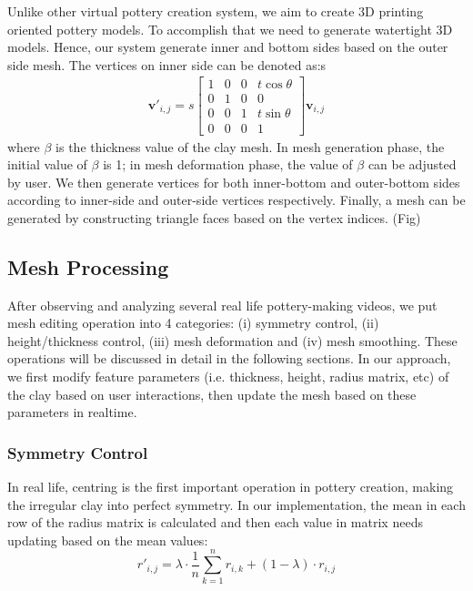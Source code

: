 Unlike other virtual pottery creation system, we aim to create 3D printing oriented pottery models. To accomplish that we need to generate watertight 3D models. Hence, our system generate inner and bottom sides based on the outer side mesh. The vertices on inner side can be denoted as:s
\begin{equation}
\begin{split}
\mathbf{v'}_{i,j} = s
\begin{bmatrix}
1 & 0 & 0 & t\cos\theta \\
0 & 1 & 0 & 0\\ 
0 & 0 & 1 & t\sin\theta \\
0 & 0 & 0 & 1 
\end{bmatrix}
\mathbf{v}_{i,j}
\end{split}
\end{equation}
where $\beta$ is the thickness value of the clay mesh. In mesh generation phase, the initial value of $\beta$ is 1; in mesh deformation phase, the value of $\beta$ can be adjusted by user.
We then generate vertices for both inner-bottom and outer-bottom sides according to inner-side and outer-side vertices respectively. Finally, a mesh can be generated by constructing triangle faces based on the vertex indices. (Fig)



\subsection{Mesh Processing}
\label{sec:4.2}
After observing and analyzing several real life pottery-making videos, we put mesh editing operation into 4 categories: (i) symmetry control, (ii) height/thickness control, (iii) mesh deformation and (iv) mesh smoothing. These operations will be discussed in detail in the following sections.
In our approach, we first modify feature parameters (i.e. thickness, height, radius matrix, etc) of the clay based on user interactions, then update the mesh based on these parameters in realtime.

\subsubsection{Symmetry Control}
\label{sec:4.2.1}
In real life, centring is the first important operation in pottery creation, making the irregular clay into perfect symmetry.
In our implementation, the mean in each row of the radius matrix is calculated and then each value in matrix needs updating based on the mean values:
\begin{equation}
r'_{i,j} = 
\lambda \cdot \frac{1}{n}\sum_{k=1}^{n} r_{i,k}
+ (1 - \lambda) \cdot r_{i,j}
\end{equation}

